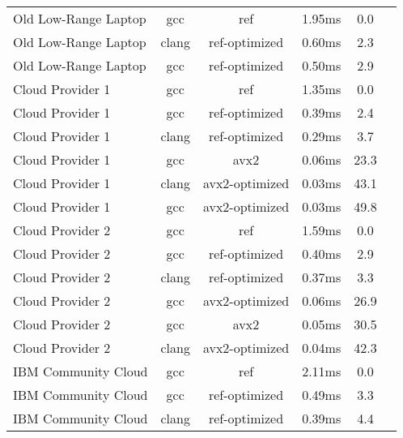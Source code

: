 \begin{table}
\begin{tabularx}{\linewidth}{X c c c c c}
        Old Low-Range Laptop &                  gcc &                  ref &  1.95ms &                  0.0\\
        Old Low-Range Laptop &                clang &        ref-optimized &  0.60ms &                  2.3\\
        Old Low-Range Laptop &                  gcc &        ref-optimized &  0.50ms &                  2.9\\
            Cloud Provider 1 &                  gcc &                  ref &  1.35ms &                  0.0\\
            Cloud Provider 1 &                  gcc &        ref-optimized &  0.39ms &                  2.4\\
            Cloud Provider 1 &                clang &        ref-optimized &  0.29ms &                  3.7\\
            Cloud Provider 1 &                  gcc &                 avx2 &  0.06ms &                 23.3\\
            Cloud Provider 1 &                clang &       avx2-optimized &  0.03ms &                 43.1\\
            Cloud Provider 1 &                  gcc &       avx2-optimized &  0.03ms &                 49.8\\
            Cloud Provider 2 &                  gcc &                  ref &  1.59ms &                  0.0\\
            Cloud Provider 2 &                  gcc &        ref-optimized &  0.40ms &                  2.9\\
            Cloud Provider 2 &                clang &        ref-optimized &  0.37ms &                  3.3\\
            Cloud Provider 2 &                  gcc &       avx2-optimized &  0.06ms &                 26.9\\
            Cloud Provider 2 &                  gcc &                 avx2 &  0.05ms &                 30.5\\
            Cloud Provider 2 &                clang &       avx2-optimized &  0.04ms &                 42.3\\
         IBM Community Cloud &                  gcc &                  ref &  2.11ms &                  0.0\\
         IBM Community Cloud &                  gcc &        ref-optimized &  0.49ms &                  3.3\\
         IBM Community Cloud &                clang &        ref-optimized &  0.39ms &                  4.4 \\
        \bottomrule
    \end{tabularx}
\end{table}